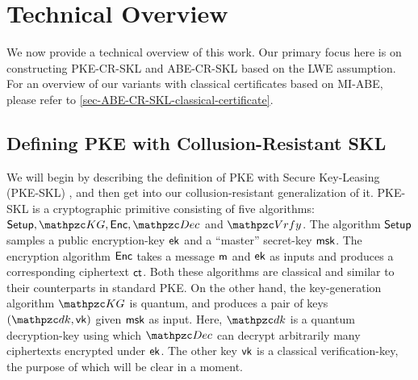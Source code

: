 
\section{Technical Overview}\label{sec:technical_overview}

\newcommand{\qDel}{\qalgo{Del}}
\newcommand{\cnc}[2]{\mathbf{CC}[#1,#2]}
\newcommand{\lock}{\mathsf{lock}}
\newcommand{\CCObf}{\mathsf{CC}.\mathsf{Obf}}
\newcommand{\CCSim}{\mathsf{CC}.\mathsf{Sim}}
\newcommand{\tlP}{\widetilde{P}}
\newcommand{\CDSKE}{\mathsf{SKECD}}
\newcommand{\SKECD}{\mathsf{SKECD}}
\newcommand{\CDec}{\mathsf{CDec}}
\newcommand{\ctlen}{\ell_{\ct}}
\newcommand{\NMSKECD}{\mathsf{NMSKECD}}
\newcommand{\sig}{\mathsf{sig}}
\newcommand{\sgn}{\mathsf{sgn}}
\newcommand{\skecd}{\mathsf{skecd}}
\renewcommand{\Check}{\mathsf{Check}}
\newcommand{\msglen}{\ell_{\msg}}
\newcommand{\PKECRSKL}{\mathsf{PKE}\textrm{-}\mathsf{CR}\textrm{-}\mathsf{SKL}}
\newcommand{\SKECRSKL}{\mathsf{SKE}\textrm{-}\mathsf{CR}\textrm{-}\mathsf{SKL}}
\newcommand{\KeyTest}{\mathsf{KeyTest}}


We now provide a technical overview of this work.  
Our primary focus here is on constructing PKE-CR-SKL and ABE-CR-SKL based on the LWE assumption.  
For an overview of our variants with classical certificates based on MI-ABE, please refer to \cref{sec-ABE-CR-SKL-classical-certificate}. 

\subsection{Defining PKE with Collusion-Resistant SKL}

We will begin by describing the definition of PKE with Secure
Key-Leasing (PKE-SKL) \cite{EC:AKNYY23,TCC:AnaPorVai23}, and then get into our collusion-resistant generalization
of it. PKE-SKL is a cryptographic primitive consisting of five
algorithms: $\Setup, \qKG, \Enc, \qDec$ and $\qVrfy$. The algorithm
$\mathsf{Setup}$ samples a public encryption-key $\mathsf{ek}$ and a ``master''
secret-key $\mathsf{msk}$. The encryption algorithm $\mathsf{Enc}$ takes a message
$\mathsf{m}$ and $\mathsf{ek}$ as inputs and produces a corresponding ciphertext
$\mathsf{ct}$. Both these algorithms are classical and similar to their
counterparts in standard PKE. On the other hand, the key-generation
algorithm $\qKG$ is quantum, and produces a pair of keys $(\qdk, \vk)$
given $\mathsf{msk}$ as input. Here, $\qdk$ is a quantum decryption-key using
which $\qDec$ can decrypt arbitrarily many ciphertexts encrypted under
$\mathsf{ek}$. The other key $\mathsf{vk}$ is a classical verification-key, the
purpose of which will be clear in a moment.

